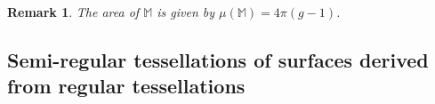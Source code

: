 \documentclass[%
reprint,
amsmath,amssymb,
aps,
]{revtex4-2}
\newcommand{\M}{\mathbb{M}}
\newtheorem{remark}[theorem]{{\bf Remark}}
\begin{document}
\begin{remark}
	The area of $\M$ is given by $\mu (\M )= 4\pi (g-1) $.
\end{remark}






\subsection{Semi-regular tessellations of surfaces derived from regular tessellations} \label{codigosNorientaveis}




%
\end{document}
